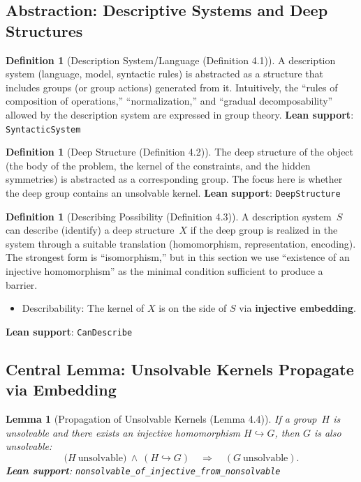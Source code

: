 \documentclass[11pt,a4paper]{article}
\theoremstyle{plain}
\newtheorem{lemma}[theorem]{Lemma}
\theoremstyle{definition}
\newtheorem{definition}[theorem]{Definition}
\newcommand{\lean}[1]{\texttt{#1}}
\begin{document}
\subsection{Abstraction: Descriptive Systems and Deep Structures}

\begin{definition}[Description System/Language (Definition 4.1)]
A description system (language, model, syntactic rules) is abstracted as a structure that includes groups (or group actions) generated from it. Intuitively, the ``rules of composition of operations,'' ``normalization,'' and ``gradual decomposability'' allowed by the description system are expressed in group theory. \textbf{Lean support}: \lean{SyntacticSystem}
\end{definition}

\begin{definition}[Deep Structure (Definition 4.2)]
The deep structure of the object (the body of the problem, the kernel of the constraints, and the hidden symmetries) is abstracted as a corresponding group. The focus here is whether the deep group contains an unsolvable kernel. \textbf{Lean support}: \lean{DeepStructure}
\end{definition}

\begin{definition}[Describing Possibility (Definition 4.3)]
A description system~$S$ can describe (identify) a deep structure~$X$ if the deep group is realized in the system through a suitable translation (homomorphism, representation, encoding). The strongest form is ``isomorphism,'' but in this section we use ``existence of an injective homomorphism'' as the minimal condition sufficient to produce a barrier.
\begin{itemize}[nosep]
\item Describability: The kernel of $X$ is on the side of $S$ via \textbf{injective embedding}.
\end{itemize}
\textbf{Lean support}: \lean{CanDescribe}
\end{definition}

\subsection{Central Lemma: Unsolvable Kernels Propagate via Embedding}

\begin{lemma}[Propagation of Unsolvable Kernels (Lemma 4.4)]
If a group~$H$ is unsolvable and there exists an injective homomorphism $H \hookrightarrow G$, then $G$ is also unsolvable:
\[
\bigl(H\ \text{unsolvable}\bigr)\ \wedge\ (H \hookrightarrow G) \quad \Longrightarrow \quad (G\ \text{unsolvable}).
\]
\textbf{Lean support}: \lean{nonsolvable\_of\_injective\_from\_nonsolvable}
\end{lemma}
\end{document}
